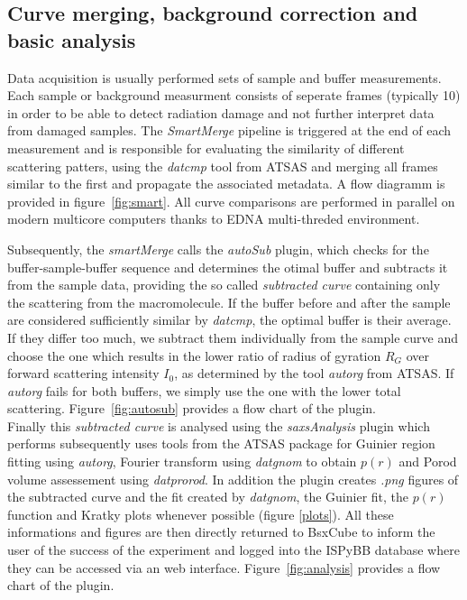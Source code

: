 \documentclass[preprint,pdf]{iucr}              %
\begin{document}
\subsection{Curve merging, background correction and basic analysis}
Data acquisition is usually performed sets of sample and buffer measurements.
Each sample or background measurment consists of seperate frames (typically 10)
in order to be able to detect radiation damage and not further interpret data from damaged samples.
The \textit{SmartMerge} pipeline is triggered at the end of each measurement
and is responsible for evaluating the similarity of different scattering
patters, using the \textit{datcmp} tool from ATSAS and merging all frames
similar to the first and propagate the associated metadata.
A flow diagramm is provided in figure~\ref{fig:smart}.
All curve comparisons are performed in parallel on modern multicore
computers thanks to EDNA multi-threded environment.

Subsequently, the \textit{smartMerge} calls the \textit{autoSub} plugin, which checks for the buffer-sample-buffer
sequence and determines the otimal buffer and subtracts it from the
sample data, providing the so called \textit{subtracted curve} containing only
the scattering from the macromolecule. If the buffer before and after the sample are considered sufficiently similar by \textit{datcmp}, the optimal buffer is their average. If they differ too much, we subtract them individually from the sample curve and choose the one which results in the lower ratio of radius of gyration $R_{G}$ over forward scattering intensity $I_{0}$, as determined by the tool \textit{autorg} from ATSAS. If \textit{autorg} fails for both buffers, we simply use the one with the lower total scattering. Figure~\ref{fig:autosub} provides a flow chart of the plugin.\\

Finally this \textit{subtracted curve} is analysed using the
\textit{saxsAnalysis} plugin which performs  subsequently uses tools from the ATSAS package for Guinier region fitting
using \textit{autorg}, Fourier transform using \textit{datgnom} to obtain
$p(r)$ and Porod volume assessement using \textit{datprorod}. In addition the plugin creates \textit{.png} figures of the subtracted curve and the fit created by \textit{datgnom}, the Guinier fit, the $p(r)$ function and Kratky plots whenever possible (figure \ref{plots}).
All these informations and figures are then directly returned to BsxCube to inform the user
of the success of the experiment and logged into the ISPyBB
database\cite{ispybb} where they can be accessed via an web interface. Figure~\ref{fig:analysis} provides a flow chart of the plugin.
\end{document}
